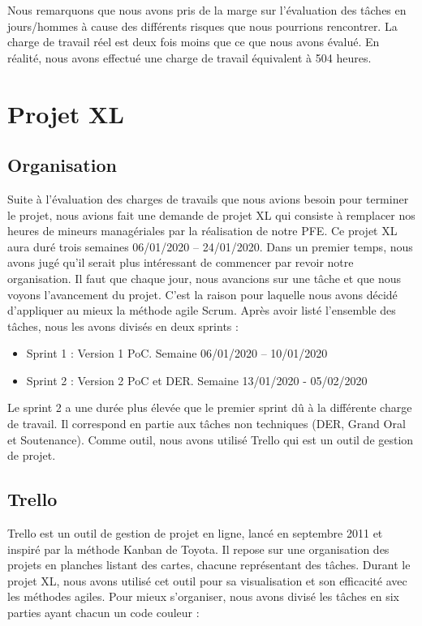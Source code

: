 Nous remarquons que nous avons pris de la marge sur l’évaluation des tâches en jours/hommes à cause des différents risques que nous pourrions rencontrer. La charge de travail réel est deux fois moins que ce que nous avons évalué. 
En réalité, nous avons effectué une charge de travail équivalent à 504 heures.





\section{Projet XL}

\subsection{Organisation}
Suite à l’évaluation des charges de travails que nous avions besoin pour terminer le projet, nous avions fait une demande de projet XL qui consiste à remplacer nos heures de mineurs managériales par la réalisation de notre PFE. 
Ce projet XL aura duré trois semaines 06/01/2020 – 24/01/2020. Dans un premier temps, nous avons jugé qu’il serait plus intéressant de commencer par revoir notre organisation. Il faut que chaque jour, nous avancions sur une tâche et que nous voyons l’avancement du projet. C’est la raison pour laquelle nous avons décidé d’appliquer au mieux la méthode agile Scrum.
Après avoir listé l’ensemble des tâches, nous les avons divisés en deux sprints :

\begin{itemize}
    \item Sprint 1 : Version 1 PoC. Semaine 06/01/2020 – 10/01/2020 
    \item Sprint 2 : Version 2 PoC et DER. Semaine 13/01/2020 - 05/02/2020
\end{itemize}

Le sprint 2 a une durée plus élevée que le premier sprint dû à la différente charge de travail. Il correspond en partie aux tâches non techniques (DER, Grand Oral et Soutenance). 
Comme outil, nous avons utilisé Trello qui est un outil de gestion de projet.  


\subsection{Trello}
Trello est un outil de gestion de projet en ligne, lancé en septembre 2011 et inspiré par la méthode Kanban de Toyota. Il repose sur une organisation des projets en planches listant des cartes, chacune représentant des tâches. 
Durant le projet XL, nous avons utilisé cet outil pour sa visualisation et son efficacité avec les méthodes agiles. 
Pour mieux s’organiser, nous avons divisé les tâches en six parties ayant chacun un code couleur : 

